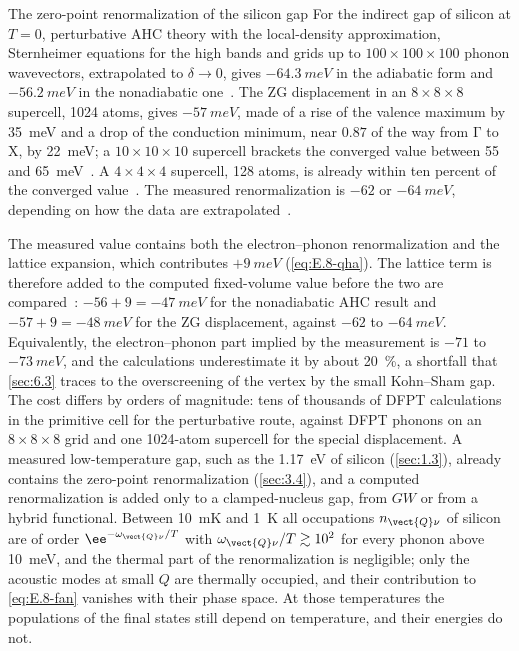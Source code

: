 \begin{workedexample}{The zero-point renormalization of the silicon gap}\label{we:E-zpr}
For the indirect gap of silicon at $T = 0$, perturbative AHC theory with the local-density approximation, Sternheimer equations for the high bands and grids up to $100\times100\times100$ phonon wavevectors, extrapolated to $\delta \to 0$, gives $-\SI{64.3}{meV}$ in the adiabatic form and $-\SI{56.2}{meV}$ in the nonadiabatic one~\cite[Table~VI]{ponce2015temperature}. The ZG displacement in an $8\times8\times8$ supercell, 1024 atoms, gives $-\SI{57}{meV}$, made of a rise of the valence maximum by \SI{35}{meV} and a drop of the conduction minimum, near $0.87$ of the way from $\mathrm{\Gamma}$ to $\mathrm{X}$, by \SI{22}{meV}; a $10\times10\times10$ supercell brackets the converged value between 55 and \SI{65}{meV}~\cite[Sect.~VII\,B]{zacharias2020theory}. A $4\times4\times4$ supercell, 128 atoms, is already within ten percent of the converged value~\cite[Sect.~VII]{zacharias2020theory}. The measured renormalization is $-62$ or $-\SI{64}{meV}$, depending on how the data are extrapolated~\cite[Table~VI]{ponce2015temperature}.

The measured value contains both the electron--phonon renormalization and the lattice expansion, which contributes $+\SI{9}{meV}$ (\cref{eq:E.8-qha}). The lattice term is therefore added to the computed fixed-volume value before the two are compared~\cite{miglio2020predominance}: $-56 + 9 = -\SI{47}{meV}$ for the nonadiabatic AHC result and $-57 + 9 = -\SI{48}{meV}$ for the ZG displacement, against $-62$ to $-\SI{64}{meV}$. Equivalently, the electron--phonon part implied by the measurement is $-71$ to $-\SI{73}{meV}$, and the calculations underestimate it by about \SI{20}{\percent}, a shortfall that \cref{sec:6.3} traces to the overscreening of the vertex by the small Kohn--Sham gap. The cost differs by orders of magnitude: tens of thousands of DFPT calculations in the primitive cell for the perturbative route, against DFPT phonons on an $8\times8\times8$ grid and one 1024-atom supercell for the special displacement. A measured low-temperature gap, such as the \SI{1.17}{eV} of silicon (\cref{sec:1.3}), already contains the zero-point renormalization (\cref{sec:3.4}), and a computed renormalization is added only to a clamped-nucleus gap, from $GW$ or from a hybrid functional. Between \SI{10}{mK} and \SI{1}{K} all occupations $n_{\vect{Q}\nu}$ of silicon are of order $\ee^{-\omega_{\vect{Q}\nu}/T}$ with $\omega_{\vect{Q}\nu}/T \gtrsim 10^2$ for every phonon above \SI{10}{meV}, and the thermal part of the renormalization is negligible; only the acoustic modes at small $Q$ are thermally occupied, and their contribution to \cref{eq:E.8-fan} vanishes with their phase space. At those temperatures the populations of the final states still depend on temperature, and their energies do not.
\end{workedexample}
